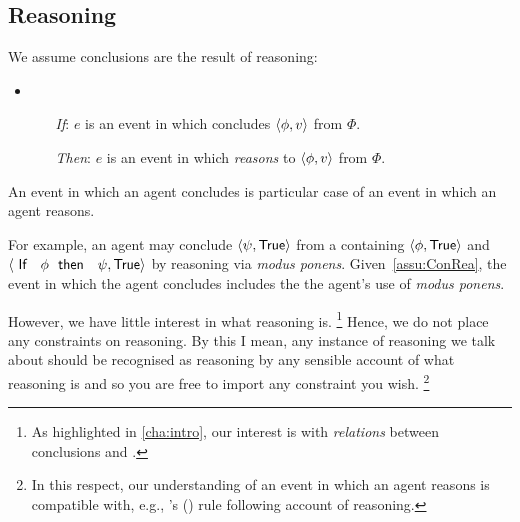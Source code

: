 \subsection{Reasoning}
\label{cha:clar:sec:Concls:reasoning}

\begin{note}
  We assume conclusions are the result of reasoning:

  \begin{assumption}
    \label{assu:ConRea}

    \begin{itemize}
    \item
      \begin{itemize}
      \item[\emph{If}:]
        \(e\) is an event in which \vAgent{} concludes \(\langle \phi, v \rangle\) from \(\Phi\).
      \item[\emph{Then}:]
        \(e\) is an event in which \vAgent{} \emph{reasons} to \(\langle \phi, v \rangle\) from \(\Phi\).
      \end{itemize}
    \end{itemize}
    \vspace{-\baselineskip}
  \end{assumption}

  An event in which an agent concludes is particular case of an event in which an agent reasons.

  For example, an agent may conclude \(\langle \psi, \text{\textsf{True}} \rangle\) from a \pool{} containing \(\langle \phi, \text{\textsf{True}} \rangle\) and \(\pv{\prop{If }\phi\prop{ then }\psi}{\val{True}}\) by reasoning via \emph{modus ponens}.
  Given~\autoref{assu:ConRea}, the event in which the agent concludes includes the the agent's use of \emph{modus ponens}.

  However, we have little interest in what reasoning is.%
  \footnote{
    As highlighted in \autoref{cha:intro}, our interest is with \emph{relations} between conclusions and \pool{}.
  }
  Hence, we do not place any constraints on reasoning.
  By this I mean, any instance of reasoning we talk about should be recognised as reasoning by any sensible account of what reasoning is and so you are free to import any constraint you wish.%
  \footnote{
    In this respect, our understanding of an event in which an agent reasons is compatible with, e.g., \citeauthor{Broome:2013aa}'s (\citeyear{Broome:2013aa}) rule following account of reasoning.

}
\end{note}
